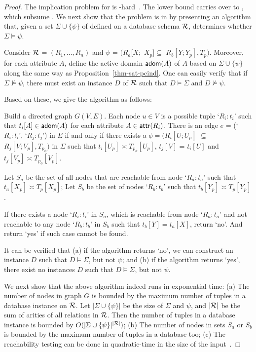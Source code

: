 \begin{proof} The implication problem for \CINDs is
\EXPTIME-hard~\cite{CINDs}. The lower bound carries over to \pCINDs,
which subsume \CINDs. We next show that the problem is in \EXPTIME
by presenting an \EXPTIME algorithm that, given a set
$\Sigma\cup\{\psi\}$ of \pCINDs defined on a database schema $\cal
R$, determines whether $\Sigma\models\psi$.

Consider $\cal R$ = $(R_1,\ldots,R_n)$ and $\psi$ = $(R_a[X;$ $X_p]
\subseteq$ $R_b[Y;Y_p], T_p)$. Moreover, for each attribute $A$,
define the active domain ${\mathsf{adom}}(A)$ of $A$ based on
$\Sigma\cup\{\psi\}$ along the same way as
Proposition~\ref{thm-sat-pcind}. One can easily verify that if
$\Sigma\not\models\psi$, there must exist an instance $D$ of ${\cal
R}$ such that $D\models\Sigma$ and $D\not\models\psi$.

Based on these, we give the \EXPTIME algorithm as follows:

\bi
\item
Build a directed graph $G(V, E)$.  Each node $u\in V$ is a possible
tuple `$R_i:t_i$' such that $t_i[A]\in {\ensuremath {\mathsf{adom}}}(A)$ for each attribute
$A\in\protect\mathsf{attr}(R_i)$. There is an edge $e$ = (`$R_i:t_i$',
`$R_j:t_j$') in $E$ if and only if there exists a \pCIND $\phi =
(R_i[U; U_p]$ $\subseteq$ $ R_j[V; V_p], T_{p_{\phi}})$ in $\Sigma$
such that $t_i[U_p] \asymp T_{p_{\phi}}[U_p]$, $t_j[V]$ = $t_i[U]$
and $t_j[V_p] \asymp T_{p_{\phi}}[V_p]$.
\item
Let $S_a$ be the set of all nodes that are reachable from node
`$R_a:t_a$' such that $t_a[X_p] \asymp T_{p}[X_p]$;
 Let $S_b$ be the
set of nodes `$R_b:t_b$' such that $t_b[Y_p] \asymp T_{p}[Y_p]$.
\item
If there exists a node `$R_i:t_i$' in $S_a$, which is reachable from
node `$R_a:t_a$' and not reachable to any node `$R_b:t_b$' in $S_b$
such that $t_b[Y] = t_a[X]$, return `no'. And return `yes' if such
case cannot be found. \ei


It can be verified that (a) if the algorithm returns `no', we can
construct an instance $D$ such that $D\models\Sigma$, but not
$\psi$; and (b) if the algorithm returns `yes', there exist no
instances $D$ such that $D\models\Sigma$, but not $\psi$.

We next show that the above algorithm indeed runs in exponential
time: (a) The number of nodes in graph $G$ is bounded by the maximum
number of tuples in a database instance on $\R$. Let
$|\Sigma\cup\{\psi\}|$ be the size of $\Sigma$ and $\psi$, and
$|\cal R|$ be the sum of arities of all relations in $\cal R$. Then
the number of tuples in a database instance is bounded by
$O(|\Sigma\cup\{\psi\}|^{|\cal
 R|})$; (b) The number of nodes in sets $S_a$ or $S_b$ is bounded by
the maximum number of tuples in a database too; (c) The reachability
testing can be done in quadratic-time in the size of the
input~\cite{Papa1994}.


\end{proof}
